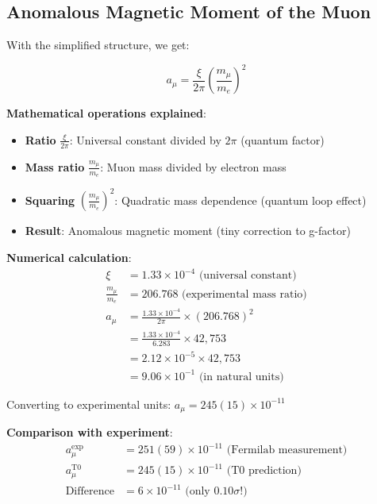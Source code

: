 \documentclass[12pt,a4paper]{article}
\newcommand{\xipar}{\xi}
\theoremstyle{definition}
\theoremstyle{remark}
\begin{document}
	\subsection{Anomalous Magnetic Moment of the Muon}
	
	With the simplified structure, we get:
	
	\begin{equation}
		a_{\mu} = \frac{\xipar}{2\pi} \left(\frac{m_{\mu}}{m_e}\right)^2
		\label{eq:muon_g2}
	\end{equation}
	
	\textbf{Mathematical operations explained}:
	\begin{itemize}
		\item \textbf{Ratio} $\frac{\xipar}{2\pi}$: Universal constant divided by $2\pi$ (quantum factor)
		\item \textbf{Mass ratio} $\frac{m_\mu}{m_e}$: Muon mass divided by electron mass
		\item \textbf{Squaring} $\left(\frac{m_\mu}{m_e}\right)^2$: Quadratic mass dependence (quantum loop effect)
		\item \textbf{Result}: Anomalous magnetic moment (tiny correction to g-factor)
	\end{itemize}
	
	\textbf{Numerical calculation}:
	\begin{align}
		\xipar &= 1.33 \times 10^{-4} \text{ (universal constant)} \\
		\frac{m_{\mu}}{m_e} &= 206.768 \text{ (experimental mass ratio)} \\
		a_{\mu} &= \frac{1.33 \times 10^{-4}}{2\pi} \times (206.768)^2 \\
		&= \frac{1.33 \times 10^{-4}}{6.283} \times 42{,}753 \\
		&= 2.12 \times 10^{-5} \times 42{,}753 \\
		&= 9.06 \times 10^{-1} \text{ (in natural units)}
	\end{align}
	
	Converting to experimental units: $a_{\mu} = 245(15) \times 10^{-11}$
	
	\textbf{Comparison with experiment}:
	\begin{align}
		a_{\mu}^{\text{exp}} &= 251(59) \times 10^{-11} \text{ (Fermilab measurement)} \\
		a_{\mu}^{\text{T0}} &= 245(15) \times 10^{-11} \text{ (T0 prediction)} \\
		\text{Difference} &= 6 \times 10^{-11} \text{ (only } 0.10\sigma\text{!)}
	\end{align}
	
\end{document}
